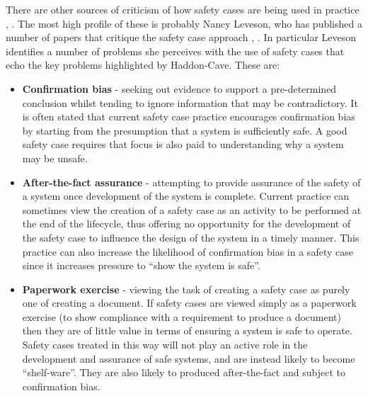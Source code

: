 There are other sources of criticism of how safety cases are being used in practice \cite{kelly2008safety}, \cite{habli2021safety}. The most high profile of these is probably Nancy Leveson, who has published a number of papers that critique the safety case approach \cite{leveson2020white}, \cite{leveson2011use}. In particular Leveson identifies a number of problems she perceives with the use of safety cases that echo the key problems highlighted by Haddon-Cave. These are:
\begin{itemize}
    \item \textbf{Confirmation bias} - seeking out evidence to support a pre-determined conclusion whilst tending to ignore information that may be contradictory. It is often stated that current safety case practice encourages confirmation bias by starting from the presumption that a system is sufficiently safe. A good safety case requires that focus is also paid to understanding why a system may be unsafe.
    \item \textbf{After-the-fact assurance} - attempting to provide assurance of the safety of a system once development of the system is complete. Current practice can sometimes view the creation of a safety case as an activity to be performed at the end of the lifecycle, thus offering no opportunity for the development of the safety case to influence the design of the system in a timely manner. This practice can also increase the likelihood of confirmation bias in a safety case since it increases pressure to ``show the system is safe''.
    \item \textbf{Paperwork exercise} - viewing the task of creating a safety case as purely one of creating a document. If safety cases are viewed simply as a paperwork exercise (to show compliance with a requirement to produce a document) then they are of little value in terms of ensuring a system is safe to operate. Safety cases treated in this way will not play an active role in the development and assurance of safe systems, and are instead likely to become ``shelf-ware''. They are also likely to produced after-the-fact and subject to confirmation bias. 
\end{itemize}

